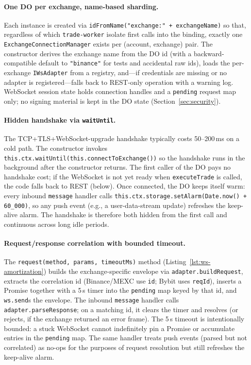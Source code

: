 \paragraph{One DO per exchange, name-based sharding.}
Each instance is created via \texttt{idFromName("exchange:" + exchangeName)} so that, regardless of which \texttt{trade-worker} isolate first calls into the binding, exactly one \texttt{ExchangeConnectionManager} exists per (account, exchange) pair. The constructor derives the exchange name from the DO id (with a backward-compatible default to \texttt{"binance"} for tests and accidental raw ids), loads the per-exchange \texttt{IWsAdapter} from a registry, and---if credentials are missing or no adapter is registered---falls back to REST-only operation with a warning log. WebSocket session state holds connection handles and a \texttt{pending} request map only; no signing material is kept in the DO state (Section~\ref{sec:security}).

\paragraph{Hidden handshake via \texttt{waitUntil}.}
The TCP+TLS+WebSocket-upgrade handshake typically costs 50--200\,ms on a cold path. The constructor invokes \texttt{this.ctx.waitUntil(this.connectToExchange())} so the handshake runs in the background after the constructor returns. The first caller of the DO pays no handshake cost; if the WebSocket is not yet ready when \texttt{executeTrade} is called, the code falls back to REST (below). Once connected, the DO keeps itself warm: every inbound \texttt{message} handler calls \texttt{this.ctx.storage.setAlarm(Date.now() + 60\_000)}, so any push event (e.g., a user-data-stream update) refreshes the keep-alive alarm. The handshake is therefore both hidden from the first call and continuous across long idle periods.

\paragraph{Request/response correlation with bounded timeout.}
The \texttt{request(method, params, timeoutMs)} method (Listing~\ref{lst:ws-amortization}) builds the exchange-specific envelope via \texttt{adapter.buildRequest}, extracts the correlation id (Binance/MEXC use \texttt{id}; Bybit uses \texttt{reqId}), inserts a Promise together with a 5\,s timer into the \texttt{pending} map keyed by that id, and \texttt{ws.send}s the envelope. The inbound \texttt{message} handler calls \texttt{adapter.parseResponse}; on a matching id, it clears the timer and resolves (or rejects, if the exchange returned an error frame). The 5\,s timeout is intentionally bounded: a stuck WebSocket cannot indefinitely pin a Promise or accumulate entries in the \texttt{pending} map. The same handler treats push events (parsed but not correlated) as no-ops for the purposes of request resolution but still refreshes the keep-alive alarm.

